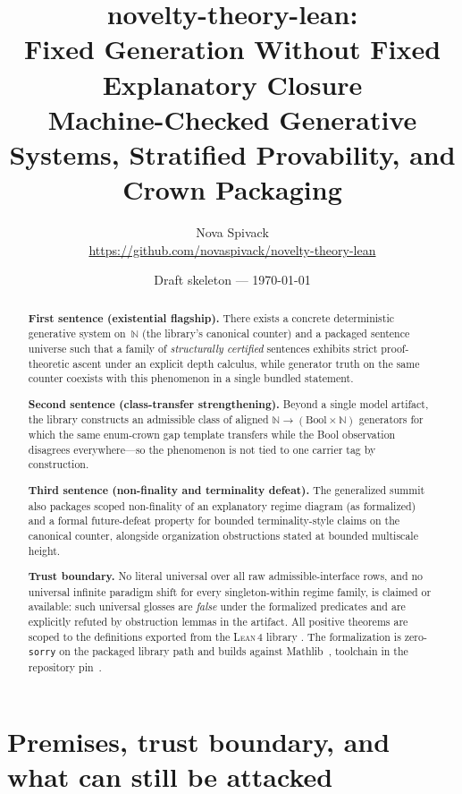 \documentclass[11pt,a4paper]{article}
\title{\textbf{novelty-theory-lean}:\\
  Fixed Generation Without Fixed Explanatory Closure\\
  {\large Machine-Checked Generative Systems, Stratified Provability, and Crown Packaging}}
\author{Nova Spivack\\
  \small\url{https://github.com/novaspivack/novelty-theory-lean}}
\date{Draft skeleton --- \today}
\theoremstyle{definition}
\newcommand{\lean}{\textsc{Lean}\,4}
\begin{document}
\maketitle

\begin{abstract}
\raggedright
\noindent\textbf{First sentence (existential flagship).}
There exists a concrete deterministic generative system on~$\mathbb{N}$
(the library's canonical counter) and a packaged sentence universe such
that a family of \emph{structurally certified} sentences exhibits strict
proof-theoretic ascent under an explicit depth calculus, while generator
truth on the same counter coexists with this phenomenon in a single
bundled statement.

\medskip
\noindent\textbf{Second sentence (class-transfer strengthening).}
Beyond a single model artifact, the library constructs an admissible
class of aligned $\mathbb{N}\to(\mathrm{Bool}\times\mathbb{N})$
generators for which the same enum-crown gap template transfers while
the Bool observation disagrees everywhere---so the phenomenon is not tied
to one carrier tag by construction.

\medskip
\noindent\textbf{Third sentence (non-finality and terminality defeat).}
The generalized summit also packages scoped non-finality of an
explanatory regime diagram (as formalized) and a formal future-defeat
property for bounded terminality-style claims on the canonical counter,
alongside organization obstructions stated at bounded multiscale height.

\medskip
\noindent\textbf{Trust boundary.}
No literal universal over all raw admissible-interface rows, and no
universal infinite paradigm shift for every singleton-within regime
family, is claimed or available: such universal glosses are \emph{false}
under the formalized predicates and are explicitly refuted by
obstruction lemmas in the artifact. All positive theorems are scoped to
the definitions exported from the \lean{} library \cite{noveltyTheoryLean2026}.
The formalization is zero-\texttt{sorry} on the packaged library path
and builds against Mathlib~\cite{mathlib4}, toolchain in the repository pin~\cite{deMoura2021}.
\end{abstract}

\tableofcontents
\bigskip

\section{Premises, trust boundary, and what can still be attacked}\label{sec:trust}
\end{document}
